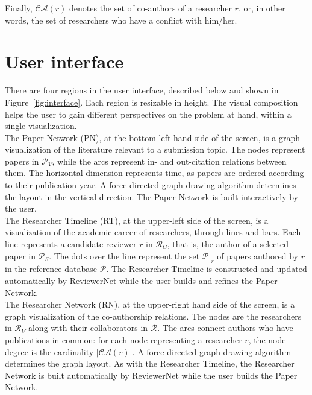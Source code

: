 Finally, $\mathcal{CA}(r)$ denotes the set of co-authors of a researcher $r$, or, in other words, the set of researchers who have a conflict with him/her. 


\chapter{User interface}
\label{sec:userinterface}

There are four regions in the user interface, described below and shown in Figure~\ref{fig:interface}. Each region is resizable in height. The visual composition helps the user to gain different perspectives on the problem at hand, within a single visualization. \\


The Paper Network (PN), at the bottom-left hand side of the screen, is a graph visualization of the literature relevant to a submission topic. The nodes represent papers in $\mathcal{P}_{V}$, while the arcs represent in- and out-citation relations between them. The horizontal dimension represents time, as papers are ordered according to their publication year. A force-directed graph drawing algorithm determines the layout in the vertical direction. The Paper Network is built interactively by the user. 
\\

The Researcher Timeline (RT), at the upper-left side of the screen, is a visualization of the academic career of researchers, through lines and bars. Each line represents a candidate reviewer $r$ in $\mathcal{R}_{C}$, that is, the author of a selected paper in $\mathcal{P}_{S}$. The dots over the line represent the set $\mathcal{P}|_{r}$ of papers authored by $r$ in the reference database $\mathcal{P}$. The Researcher Timeline is constructed and updated automatically by ReviewerNet while the user builds and refines the Paper Network.  \\

The Researcher Network (RN), at the upper-right hand side of the screen, is a graph visualization of the co-authorship relations. The nodes are the researchers in $\mathcal{R}_V$ along with their collaborators in $\mathcal{R}$. The arcs connect authors who have publications in common: for each node representing a researcher $r$, the node degree is the cardinality $\vert \mathcal{CA}(r) \vert$. A force-directed graph drawing algorithm determines the graph layout. As with the Researcher Timeline, the Researcher Network is built automatically by ReviewerNet while the user builds the Paper Network.  \\

